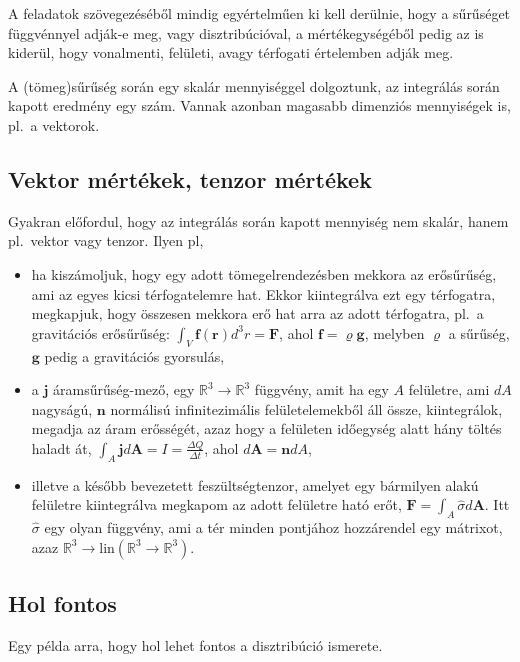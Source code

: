 \documentclass[12pt,a4paper]{scrartcl}
\let\mathbf\bm
\begin{document}
A feladatok szövegezéséből mindig egyértelműen ki kell derülnie, hogy a sűrűséget függvénnyel adják-e meg, vagy disztribúcióval, a mértékegységéből pedig az is kiderül, hogy vonalmenti, felületi, avagy térfogati értelemben adják meg.

A (tömeg)sűrűség során egy skalár mennyiséggel dolgoztunk, az integrálás során kapott eredmény egy szám. Vannak azonban magasabb dimenziós mennyiségek is, pl.\ a vektorok.

\subsection{Vektor mértékek, tenzor mértékek}
Gyakran előfordul, hogy az integrálás során kapott mennyiség nem skalár, hanem pl.\ vektor vagy tenzor. Ilyen pl,
\begin{itemize}
\item ha kiszámoljuk, hogy egy adott tömegelrendezésben mekkora az erősűrűség, ami az egyes kicsi térfogatelemre hat. Ekkor kiintegrálva ezt egy térfogatra, megkapjuk, hogy összesen mekkora erő hat arra az adott térfogatra, pl.\ a gravitációs erősűrűség: $\int_V {{\mathbf{f}}\left( {\mathbf{r}} \right){d^3}r}  = {\mathbf{F}}$, ahol ${\mathbf{f}} = \varrho {\mathbf{g}}$, melyben $\varrho$ a sűrűség, ${\mathbf{g}}$ pedig a gravitációs gyorsulás,
\item a ${\mathbf{j}}$ áramsűrűség-mező, egy ${\mathbb{R}^3} \to {\mathbb{R}^3}$ függvény, amit ha egy $A$ felületre, ami $dA$ nagyságú, ${\mathbf{n}}$ normálisú infinitezimális felületelemekből áll össze, kiintegrálok, megadja az áram erősségét, azaz hogy a felületen időegység alatt hány töltés haladt át, $\int_A {\mathbf{j}} d{\mathbf{A}} = I = \frac{{\Delta Q}}{{\Delta t}}$, ahol $d{\mathbf{A}} = {\mathbf{n}}dA$,
\item illetve a később bevezetett feszültségtenzor, amelyet egy bármilyen alakú felületre kiintegrálva megkapom az adott felületre ható erőt, ${\mathbf{F}} = \int_A {\hat \sigma d{\mathbf{A}}} $. Itt $\hat \sigma$ egy olyan függvény, ami a tér minden pontjához hozzárendel egy mátrixot, azaz ${\mathbb{R}^3} \to {\text{lin}}\left( {{\mathbb{R}^3} \to {\mathbb{R}^3}} \right)$.
\end{itemize}

\subsection{Hol fontos}
Egy példa arra, hogy hol lehet fontos a disztribúció ismerete.
\end{document}
